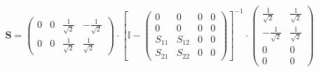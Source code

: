 \[ \mathbf{S} = \left(\begin{smallmatrix} 0 & 0 & \frac{1}{\sqrt{2}} &
-\frac{1}{\sqrt{2}} \\ 0 & 0 & \frac{1}{\sqrt{2}} & \frac{1}{\sqrt{2}}
\end{smallmatrix}\right) \cdot \left[ \mathbb{I}  -
\left(\begin{smallmatrix} 0 & 0 & 0 & 0 \\ 0 & 0 & 0 & 0 \\ S_{11} &
S_{12} & 0 & 0 \\ S_{21} & S_{22} & 0 & 0 \end{smallmatrix}\right)
\right]^{-1} \cdot\left(\begin{smallmatrix} \frac{1}{\sqrt{2}} &
\frac{1}{\sqrt{2}} \\ -\frac{1}{\sqrt{2}} & \frac{1}{\sqrt{2}} \\ 0 &
0 \\ 0 & 0 \end{smallmatrix}\right) \]
